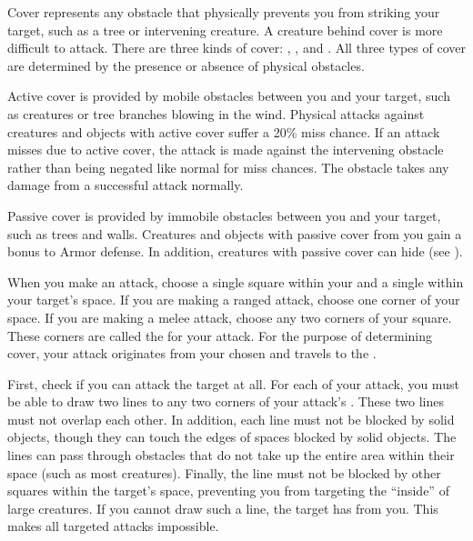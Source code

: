             Cover represents any obstacle that physically prevents you from striking your target, such as a tree or intervening creature.
            A creature behind cover is more difficult to attack.
            There are three kinds of cover: , , and .
            All three types of cover are determined by the presence or absence of physical obstacles.

            \label{Active Cover} Active cover is provided by mobile obstacles between you and your target, such as creatures or tree branches blowing in the wind.
            Physical attacks against creatures and objects with active cover suffer a 20\% miss chance.
            If an attack misses due to active cover, the attack is made against the intervening obstacle rather than being negated like normal for miss chances.
            The obstacle takes any damage from a successful attack normally.

            \label{Passive Cover} Passive cover is provided by immobile obstacles between you and your target, such as trees and walls.
            Creatures and objects with passive cover from you gain a  bonus to Armor defense.
            In addition, creatures with passive cover can hide (see ).


            When you make an attack, choose a single square within your  and a single  within your target's space.
            If you are making a ranged attack, choose one corner of your space.
            If you are making a melee attack, choose any two corners of your square.
            These corners are called the  for your attack.
            For the purpose of determining cover, your attack originates from your chosen  and travels to the .

            First, check if you can attack the target at all.
            For each  of your attack, you must be able to draw two lines to any two corners of your attack's .
            These two lines must not overlap each other.
            In addition, each line must not be blocked by solid objects, though they can touch the edges of spaces blocked by solid objects.
            The lines can pass through obstacles that do not take up the entire area within their space (such as most creatures).
            Finally, the line must not be blocked by other squares within the target's space, preventing you from targeting the ``inside'' of large creatures.
            If you cannot draw such a line, the target has  from you.
            This makes all targeted attacks impossible.

